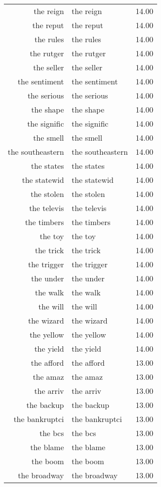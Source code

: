 \begin{table}[ht]
\begin{tabular}{rlr}
  the reign & the reign & 14.00 \\ 
  the reput & the reput & 14.00 \\ 
  the rules & the rules & 14.00 \\ 
  the rutger & the rutger & 14.00 \\ 
  the seller & the seller & 14.00 \\ 
  the sentiment & the sentiment & 14.00 \\ 
  the serious & the serious & 14.00 \\ 
  the shape & the shape & 14.00 \\ 
  the signific & the signific & 14.00 \\ 
  the smell & the smell & 14.00 \\ 
  the southeastern & the southeastern & 14.00 \\ 
  the states & the states & 14.00 \\ 
  the statewid & the statewid & 14.00 \\ 
  the stolen & the stolen & 14.00 \\ 
  the televis & the televis & 14.00 \\ 
  the timbers & the timbers & 14.00 \\ 
  the toy & the toy & 14.00 \\ 
  the trick & the trick & 14.00 \\ 
  the trigger & the trigger & 14.00 \\ 
  the under & the under & 14.00 \\ 
  the walk & the walk & 14.00 \\ 
  the will & the will & 14.00 \\ 
  the wizard & the wizard & 14.00 \\ 
  the yellow & the yellow & 14.00 \\ 
  the yield & the yield & 14.00 \\ 
  the afford & the afford & 13.00 \\ 
  the amaz & the amaz & 13.00 \\ 
  the arriv & the arriv & 13.00 \\ 
  the backup & the backup & 13.00 \\ 
  the bankruptci & the bankruptci & 13.00 \\ 
  the bcs & the bcs & 13.00 \\ 
  the blame & the blame & 13.00 \\ 
  the boom & the boom & 13.00 \\ 
  the broadway & the broadway & 13.00 \\ 

\end{tabular}
\end{table}
